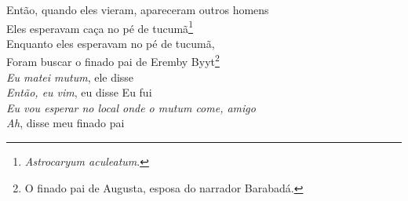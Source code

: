 \bigskip

\begin{linenumbers}
 
\noindent   Então, quando eles vieram, apareceram outros homens\\
  Eles esperavam caça no pé de tucumã\footnote{\textit{Astrocaryum
   aculeatum}.}\\
  Enquanto eles esperavam no pé de tucumã,\\
  Foram buscar o finado pai de Eremby Byyt\footnote{O finado pai de
   Augusta, esposa do narrador Barabadá.}\\
  \textit{Eu matei mutum}, ele disse\\
  \textit{Então, eu vim}, eu disse
  Eu fui\\
  \textit{Eu vou esperar no local onde o mutum come, amigo}\\
  \textit{Ah}, disse meu finado pai
 
\end{linenumbers}

\bigskip

